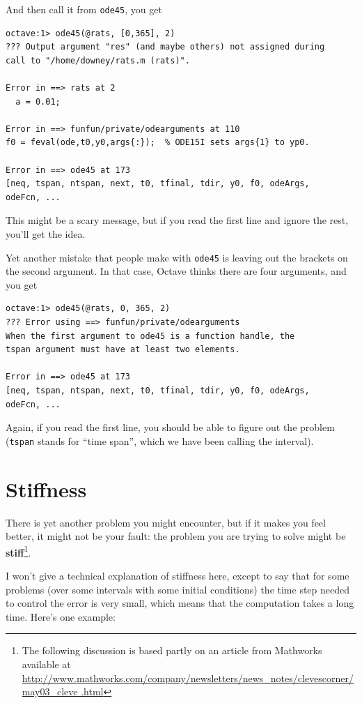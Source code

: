 \documentclass{book}
\begin{document}
And then call it from {\tt ode45}, you get

\begin{verbatim}
octave:1> ode45(@rats, [0,365], 2)
??? Output argument "res" (and maybe others) not assigned during 
call to "/home/downey/rats.m (rats)".

Error in ==> rats at 2
  a = 0.01;

Error in ==> funfun/private/odearguments at 110
f0 = feval(ode,t0,y0,args{:});  % ODE15I sets args{1} to yp0.

Error in ==> ode45 at 173
[neq, tspan, ntspan, next, t0, tfinal, tdir, y0, f0, odeArgs, 
odeFcn, ...
\end{verbatim}

This might be a scary message, but if you read the first line
and ignore the rest, you'll get the idea.

Yet another mistake that people make with {\tt ode45} is leaving
out the brackets on the second argument. In that case, Octave
thinks there are four arguments, and you get

\begin{verbatim}
octave:1> ode45(@rats, 0, 365, 2)
??? Error using ==> funfun/private/odearguments
When the first argument to ode45 is a function handle, the 
tspan argument must have at least two elements.

Error in ==> ode45 at 173
[neq, tspan, ntspan, next, t0, tfinal, tdir, y0, f0, odeArgs, 
odeFcn, ...
\end{verbatim}

Again, if you read the first line, you should be able to figure
out the problem ({\tt tspan} stands for ``time span'', which we
have been calling the interval).


\section{Stiffness}

There is yet another problem you might encounter, but if it makes you
feel better, it might not be your fault: the problem you are trying to
solve might be {\bf stiff}\footnote{The following discussion is based
partly on an article from Mathworks available at
\url{
http://www.mathworks.com/company/newsletters/news_notes/clevescorner/may03_cleve
.html}}.

I won't give a technical explanation of stiffness here, except
to say that for some problems (over some intervals with some initial
conditions) the time step needed to control the error is very small,
which means that the computation takes a long time. Here's one
example:
\end{document}
